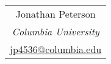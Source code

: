 \begin{tabular}{c}
Jonathan Peterson\\[1ex]
{\small\emph{Columbia University}}\\[0.5ex]
{\small\href{mailto:jp4536@columbia.edu}{jp4536@columbia.edu}}
\end{tabular}